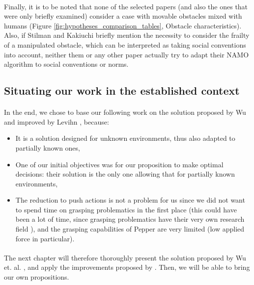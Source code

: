 \paragraph{} Finally, it is to be noted that none of the selected papers (and also the ones that were only briefly examined) consider a case with movable obstacles mixed with humans (Figure \ref{fig:hypotheses_comparison_tables}, Obstacle characteristics). Also, if Stilman \parencite{stilman_navigation_2005} and Kakiuchi \parencite{kakiuchi_working_2010} briefly mention the necessity to consider the frailty of a manipulated obstacle, which can be interpreted as taking social conventions into account, neither them or any other paper actually try to adapt their NAMO algorithm to social conventions or norms.

\subsection{Situating our work in the established context}

\paragraph{} In the end, we chose to base our following work on the solution proposed by Wu and improved by Levihn \parencite{wu_navigation_2010, levihn_locally_2014}, because:
\begin{itemize}
  \item It is a solution designed for unknown environments, thus also adapted to partially known ones,
  \item One of our initial objectives was for our proposition to make optimal decisions: their solution is the only one allowing that for partially known environments,
  \item The reduction to push actions is not a problem for us since we did not want to spend time on grasping problematics in the first place (this could have been a lot of time, since grasping problematics have their very own research field \parencite{sahbani_overview_2012}), and the grasping capabilities of Pepper are very limited (low applied force in particular).
\end{itemize}

\paragraph{} The next chapter will therefore thoroughly present the solution proposed by Wu et. al. \parencite{wu_navigation_2010}, and apply the improvements proposed by \parencite{levihn_locally_2014}. Then, we will be able to bring our own propositions.

